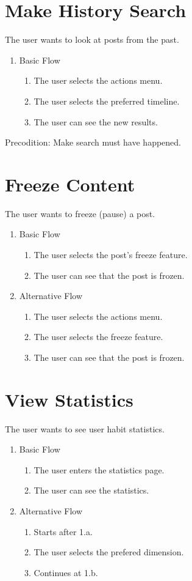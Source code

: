 \section{Make History Search}
The user wants to look at posts from the past.
\begin{enumerate}
\item Basic Flow
  \begin{enumerate}
    \item The user selects the actions menu.
    \item The user selects the preferred timeline.
    \item The user can see the new results.
  \end{enumerate}
\end{enumerate}
Precodition: \newline
Make search must have happened.

\section{Freeze Content}
The user wants to freeze (pause) a post.
\begin{enumerate}
  \item Basic Flow
  \begin{enumerate}
    \item The user selects the post's freeze feature.
    \item The user can see that the post is frozen.
  \end{enumerate}
  \item Alternative Flow
  \begin{enumerate}
    \item The user selects the actions menu.
    \item The user selects the freeze feature.
    \item The user can see that the post is frozen.
  \end{enumerate}
\end{enumerate}

\section{View Statistics}
The user wants to see user habit statistics.
\begin{enumerate}
  \item Basic Flow
  \begin{enumerate}
    \item The user enters the statistics page.
    \item The user can see the statistics.
  \end{enumerate}
  \item Alternative Flow
  \begin{enumerate}
    \item Starts after 1.a.
    \item The user selects the prefered dimension.
    \item Continues at 1.b.
  \end{enumerate}
\end{enumerate}

